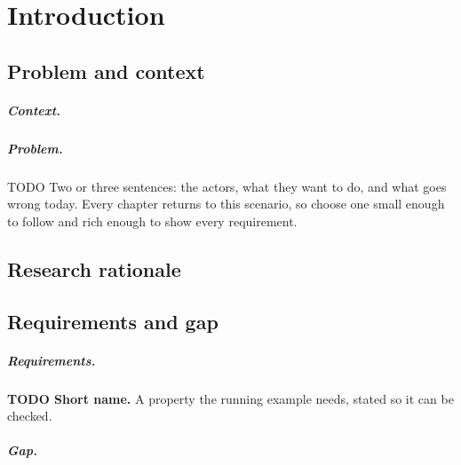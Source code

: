 \chapter{Introduction}\label{ch:intro}

\section{Problem and context}
\paragraph{Context.}\label{par:context}

\paragraph{Problem.}\label{par:problem}
\begin{runningexample}
TODO Two or three sentences: the actors, what they want to do, and what goes wrong today. Every chapter returns to this scenario, so choose one small enough to follow and rich enough to show every requirement.
\end{runningexample}

\section{Research rationale}\label{sec:rationale}

\section{Requirements and gap}
\paragraph{Requirements.}
\begin{requirements}
  \item\label{req:first} \textbf{TODO Short name.} A property the running example needs, stated so it can be checked.
\end{requirements}

\paragraph{Gap.}\label{par:gap}


